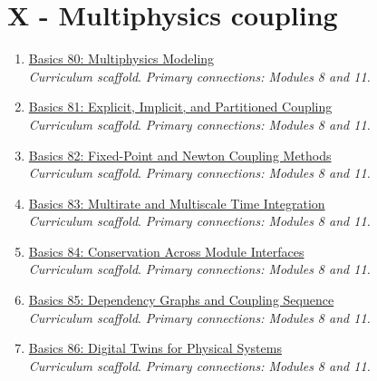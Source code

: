 \documentclass[11pt]{article}
\begin{document}
\section{X - Multiphysics coupling}
\begin{enumerate}[leftmargin=2.4em]
\item[\textbf{80.}] \href{run:basics_80_multiphysics_modeling.pdf}{Basics 80: Multiphysics Modeling}\\[-0.2em]
\textit{Curriculum scaffold}. \textit{Primary connections: Modules 8 and 11.}
\item[\textbf{81.}] \href{run:basics_81_explicit_implicit_and_partitioned_coupling.pdf}{Basics 81: Explicit, Implicit, and Partitioned Coupling}\\[-0.2em]
\textit{Curriculum scaffold}. \textit{Primary connections: Modules 8 and 11.}
\item[\textbf{82.}] \href{run:basics_82_fixed_point_and_newton_coupling_methods.pdf}{Basics 82: Fixed-Point and Newton Coupling Methods}\\[-0.2em]
\textit{Curriculum scaffold}. \textit{Primary connections: Modules 8 and 11.}
\item[\textbf{83.}] \href{run:basics_83_multirate_and_multiscale_time_integration.pdf}{Basics 83: Multirate and Multiscale Time Integration}\\[-0.2em]
\textit{Curriculum scaffold}. \textit{Primary connections: Modules 8 and 11.}
\item[\textbf{84.}] \href{run:basics_84_conservation_across_module_interfaces.pdf}{Basics 84: Conservation Across Module Interfaces}\\[-0.2em]
\textit{Curriculum scaffold}. \textit{Primary connections: Modules 8 and 11.}
\item[\textbf{85.}] \href{run:basics_85_dependency_graphs_and_coupling_sequence.pdf}{Basics 85: Dependency Graphs and Coupling Sequence}\\[-0.2em]
\textit{Curriculum scaffold}. \textit{Primary connections: Modules 8 and 11.}
\item[\textbf{86.}] \href{run:basics_86_digital_twins_for_physical_systems.pdf}{Basics 86: Digital Twins for Physical Systems}\\[-0.2em]
\textit{Curriculum scaffold}. \textit{Primary connections: Modules 8 and 11.}
\end{enumerate}
\end{document}
